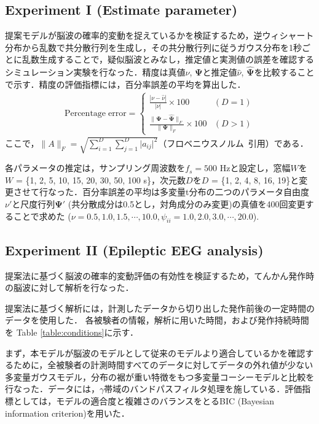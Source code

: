 \documentclass[journal]{IEEEtran}
\begin{document}
\subsection{Experiment I (Estimate parameter) }
提案モデルが脳波の確率的変動を捉えているかを検証するため，逆ウィシャート分布から乱数で共分散行列を生成し，その共分散行列に従うガウス分布を1秒ごとに乱数生成することで，疑似脳波とみなし，推定値と実測値の誤差を確認するシミュレーション実験を行なった．精度は真値$\nu$, $\mathbf{\Psi}$と推定値$\hat{\nu}$, $\hat{\mathbf{\Psi}}$を比較することで示す．精度の評価指標には，百分率誤差の平均を算出した．
\begin{eqnarray}%
	\mathrm{Percentage\;error} = \begin{cases}
    \displaystyle  \frac{|\nu-\hat{\nu}|}{|\nu|}\times100 & (D=1)\\
    \displaystyle \frac{\|\mathbf{\Psi}-\hat{\mathbf{\Psi}}\|_F}{\|\mathbf{\Psi}\|_F}\times100 & (D>1)
\end{cases}
\end{eqnarray}
ここで，$\|A\|_F=\sqrt{\sum_{i=1}^D \sum_{j=1}^D {|a_{ij}}|^2}$（フロベニウスノルム~引用）である．

各パラメータの推定は，サンプリング周波数を$f_s=500$ Hzと設定し，窓幅$W$を$W$ = \{1, 2, 5, 10, 15, 20, 30, 50, 100 s\}，次元数$D$を$D$ = \{1, 2, 4, 8, 16, 19\}と変更させて行なった．百分率誤差の平均は多変量t分布の二つのパラメータ自由度$\nu'$と尺度行列$\mathbf{\Psi}'$ (共分散成分は0.5とし，対角成分のみ変更)の真値を400回変更することで求めた ($\nu=0.5,1.0,1.5,\cdots,10.0, \psi_{ii} =1.0, 2.0, 3.0,\cdots, 20.0$).

\subsection{Experiment II (Epileptic EEG analysis)}
提案法に基づく脳波の確率的変動評価の有効性を検証するため，てんかん発作時の脳波に対して解析を行なった．

提案法に基づく解析には，計測したデータから切り出した発作前後の一定時間のデータを使用した．
各被験者の情報，解析に用いた時間，および発作持続時間を Table \ref{table:conditions}に示す．

まず，本モデルが脳波のモデルとして従来のモデルより適合しているかを確認するために，全被験者の計測時間すべてのデータに対してデータの外れ値が少ない多変量ガウスモデル，分布の裾が重い特徴をもつ多変量コーシーモデルと比較を行なった．データには，$\gamma$帯域のバンドパスフィルタ処理を施している．評価指標としては，モデルの適合度と複雑さのバランスをとるBIC (Bayesian information criterion)を用いた．
\end{document}
